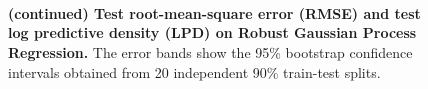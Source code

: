 \begin{figure}[H]
  \vspace{0.05in}\\
  \vspace{0.05in}\\
  \vspace{0.05in}\\
  \caption{\textbf{(continued) Test root-mean-square error (RMSE) and test log predictive density (LPD) on Robust Gaussian Process Regression.}
  The error bands show the 95\% bootstrap confidence intervals obtained from 20 independent 90\% train-test splits.
  }
\end{figure}


